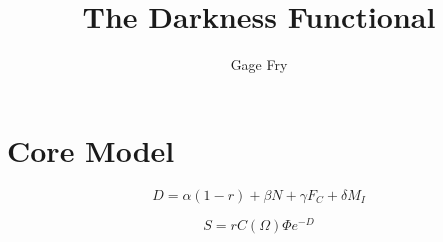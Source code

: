 ﻿\documentclass[11pt]{article}
\title{The Darkness Functional}
\author{Gage Fry}
\begin{document}
\maketitle

\section{Core Model}

\[
D = \alpha(1-r) + \beta N + \gamma F_C + \delta M_I
\]

\[
S = r C(\Omega)\Phi e^{-D}
\]
\end{document}
